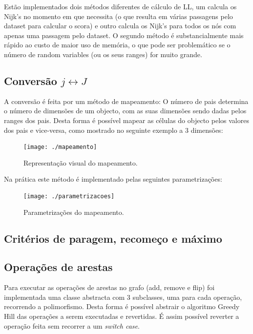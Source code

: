\documentclass[10pt]{article}
\numberwithin{equation}{section}
\begin{document}
Estão implementados dois métodos diferentes de cálculo de LL, um calcula os Nijk's no momento em que necessita (o que resulta em várias passagens pelo dataset para calcular o scora) e outro calcula os Nijk's para todos os nós com apenas uma passagem pelo dataset. O segundo método é substancialmente mais rápido ao custo de maior uso de memória, o que pode ser problemático se o número de random variables (ou os seus ranges) for muito grande.

\subsection{Conversão $j \leftrightarrow J$}
A conversão é feita por um método de mapeamento: 
O número de pais determina o número de dimensões de um objecto, com as suas dimensões sendo dadas pelos ranges dos pais. Desta forma é possível mapear as células do objecto pelos valores dos pais e vice-versa, como mostrado no seguinte exemplo a 3 dimensões:

\begin{figure}[H]
	\centering
	\texttt{[image: ./mapeamento]}
	\caption{Representação visual do mapeamento.}
	\vspace{-0.8em}
\end{figure}

Na prática este método é implementado pelas seguintes parametrizações:

\begin{figure}[H]
	\centering
	\texttt{[image: ./parametrizacoes]}
	\caption{Parametrizações do mapeamento.}
	\vspace{-0.8em}
\end{figure}

\subsection{Critérios de paragem, recomeço e máximo}


\subsection{Operações de arestas}
Para executar as operações de arestas no grafo (add, remove e flip) foi implementada uma classe abstracta com 3 subclasses, uma para cada operação, recorrendo a polimorfismo. Desta forma é possível abstrair o algoritmo Greedy Hill das operações a serem executadas e revertidas. É assim possível reverter a operação feita sem recorrer a um \textit{switch case}. 
\end{document}
